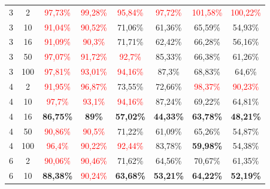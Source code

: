 \begin{table}[ht]
\begin{tabular}{cc|c|c|c|c|c|c}
        {3} & {2}   & \textcolor{red}{97,73\%} & \textcolor{red}{99,28\%} & \textcolor{red}{95,84\%} & \textcolor{red}{97,72\%} & \textcolor{red}{101,58\%} & \textcolor{red}{100,22\%} \\
        {3} & {10}  & \textcolor{red}{91,04\%} & \textcolor{red}{90,52\%} & {71,06\%}                & {61,36\%}                & {65,59\%}                 & {54,93\%}                 \\
        {3} & {16}  & \textcolor{red}{91,09\%} & \textcolor{red}{90,3\%}  & {71,71\%}                & {62,42\%}                & {66,28\%}                 & {56,16\%}                 \\
        {3} & {50}  & \textcolor{red}{97,07\%} & \textcolor{red}{91,72\%} & \textcolor{red}{92,7\%}  & {85,33\%}                & {66,38\%}                 & {61,26\%}                 \\
        {3} & {100} & \textcolor{red}{97,81\%} & \textcolor{red}{93,01\%} & \textcolor{red}{94,16\%} & {87,3\%}                 & {68,83\%}                 & {64,6\%}                  \\
        {4} & {2}   & \textcolor{red}{91,95\%} & \textcolor{red}{96,87\%} & {73,55\%}                & {72,66\%}                & \textcolor{red}{98,37\%}  & \textcolor{red}{90,23\%}  \\
        {4} & {10}  & \textcolor{red}{97,7\%}  & \textcolor{red}{93,1\%}  & \textcolor{red}{94,16\%} & {87,24\%}                & {69,22\%}                 & {64,81\%}                 \\
        {4} & {16}  & \textbf{86,75\%}         & \textbf{89\%}            & \textbf{57,02\%}         & \textbf{44,33\%}         & \textbf{63,78\%}          & \textbf{48,21\%}          \\
        {4} & {50}  & \textcolor{red}{90,86\%} & \textcolor{red}{90,5\%}  & {71,22\%}                & {61,09\%}                & {65,26\%}                 & {54,87\%}                 \\
        {4} & {100} & \textcolor{red}{96,4\%}  & \textcolor{red}{90,22\%} & \textcolor{red}{92,44\%} & {83,78\%}                & \textbf{59,98\%}          & {54,38\%}                 \\
        {6} & {2}   & \textcolor{red}{90,06\%} & \textcolor{red}{90,46\%} & {71,62\%}                & {64,56\%}                & {70,67\%}                 & {61,35\%}                 \\
        {6} & {10}  & \textbf{88,38\%}         & \textcolor{red}{90,24\%} & \textbf{63,68\%}         & \textbf{53,21\%}         & \textbf{64,22\%}          & \textbf{52,19\%}          \\

\end{tabular}
\end{table}
